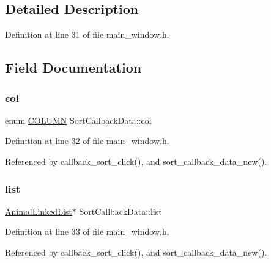 \subsection{Detailed Description}


Definition at line 31 of file main\+\_\+window.\+h.



\subsection{Field Documentation}
\mbox{\label{struct_sort_callback_data_a0e28c35278440f85596b96930dcf7025}} 
\subsubsection{\texorpdfstring{col}{col}}
{\footnotesize\ttfamily enum \mbox{\hyperlink{main__window_8h_a727e9b9696032b380d0072840595ef05}{C\+O\+L\+U\+MN}} Sort\+Callback\+Data\+::col}



Definition at line 32 of file main\+\_\+window.\+h.



Referenced by callback\+\_\+sort\+\_\+click(), and sort\+\_\+callback\+\_\+data\+\_\+new().

\mbox{\label{struct_sort_callback_data_a7fb8d190af45cd79bcf2f1cf986d018b}} 
\subsubsection{\texorpdfstring{list}{list}}
{\footnotesize\ttfamily \mbox{\hyperlink{struct_animal_linked_list}{Animal\+Linked\+List}}$\ast$ Sort\+Callback\+Data\+::list}



Definition at line 33 of file main\+\_\+window.\+h.



Referenced by callback\+\_\+sort\+\_\+click(), and sort\+\_\+callback\+\_\+data\+\_\+new().

\mbox{\label{struct_sort_callback_data_a156725d482db7655e8817dc15865d191}} 
